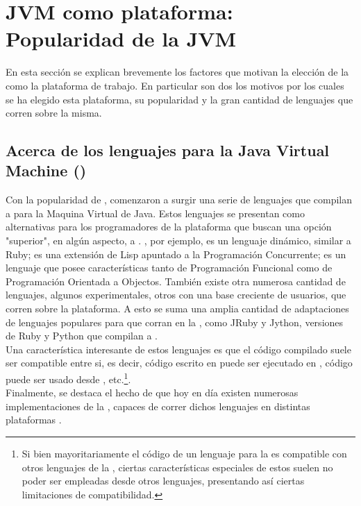 \section{JVM como plataforma: Popularidad de la JVM}
\label{appendix:jvm}

En esta sección se explican brevemente los factores que motivan la elección de 
la \jvm como la plataforma de trabajo. En particular son dos los motivos por 
los cuales se ha elegido esta plataforma, su popularidad y la gran cantidad de 
lenguajes que corren sobre la misma.\\

\subsection{Acerca de los lenguajes para la Java Virtual Machine (\jvm)}
\label{subsec:intro:about_jvm}

Con la popularidad de \java, comenzaron a surgir una serie de lenguajes que 
compilan a \bytecode para la Maquina Virtual de Java. Estos lenguajes se 
presentan como alternativas para los programadores de la plataforma que buscan 
una opción "superior", en algún aspecto, a \java. \groovy, por ejemplo, es un lenguaje dinámico, similar a Ruby; \clojure es una extensión 
de Lisp apuntado a la Programación Concurrente; \scala es un lenguaje que 
posee características tanto de Programación Funcional como de Programación 
Orientada a Objectos.  También existe otra numerosa cantidad de lenguajes, 
algunos experimentales, otros con una base creciente de usuarios, que corren 
sobre la plataforma. A  esto se suma una amplia cantidad de adaptaciones de 
lenguajes populares para que corran en la \jvm, como JRuby y Jython, versiones 
de Ruby y Python que compilan a \bytecode \java 
{}.\\
Una característica interesante de estos lenguajes es que el código compilado 
suele ser compatible entre si, es decir, código escrito en \java puede ser 
ejecutado en \scala, código \groovy puede ser usado desde \clojure, 
etc.\footnote{
	Si bien mayoritariamente el código de un lenguaje para la \jvm es 
	compatible con otros lenguajes de la \jvm, ciertas características 
	especiales de estos suelen no poder ser empleadas desde otros lenguajes, 
	presentando así ciertas limitaciones de compatibilidad.
}.\\
Finalmente, se destaca el hecho de que hoy en día existen numerosas 
implementaciones de la \jvm, capaces de correr dichos lenguajes en 
distintas plataformas .\\


